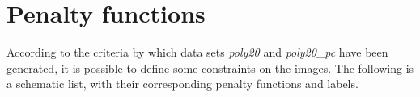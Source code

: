 \begin{description}
\end{description}


\section{Penalty functions}

According to the criteria by which data sets \textit{poly20} and \textit{poly20\_pc} have been generated, it is possible to define some constraints on the images. The following is a schematic list, with their corresponding penalty functions and labels.



